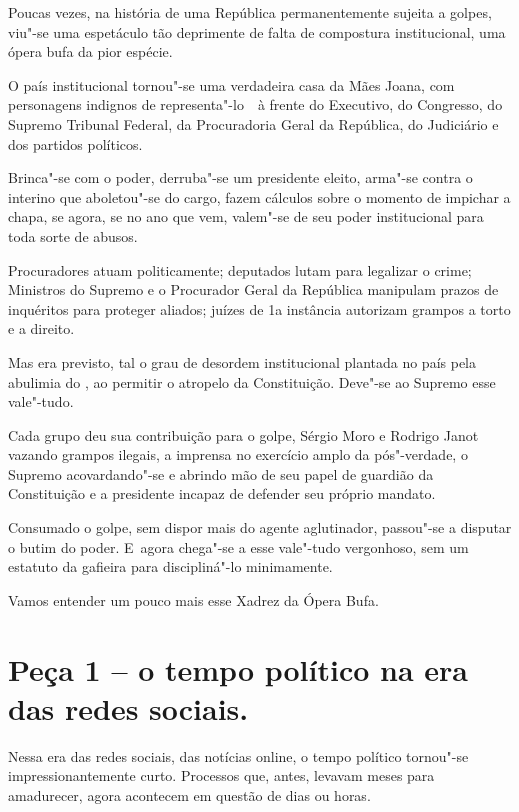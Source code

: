  

Poucas vezes, na história de uma República permanentemente sujeita a
golpes, viu"-se uma espetáculo tão deprimente de falta de compostura
institucional, uma ópera bufa da pior espécie.

O país institucional tornou"-se uma verdadeira casa da Mães Joana, com
personagens indignos de representa"-lo~~à frente do Executivo, do
Congresso, do Supremo Tribunal Federal, da Procuradoria Geral da
República, do Judiciário e dos partidos políticos.

Brinca"-se com o poder, derruba"-se um presidente eleito, arma"-se contra o
interino que aboletou"-se do cargo, fazem cálculos sobre o momento de
impichar a chapa, se agora, se no ano que vem, valem"-se de seu poder
institucional para toda sorte de abusos.

Procuradores atuam politicamente; deputados lutam para legalizar o
crime; Ministros do Supremo e o Procurador Geral da República manipulam
prazos de inquéritos para proteger aliados; juízes de 1a instância
autorizam grampos a torto e a direito.

Mas era previsto, tal o grau de desordem institucional plantada no país
pela abulimia do , ao permitir o atropelo da Constituição. Deve"-se ao
Supremo esse vale"-tudo.

Cada grupo deu sua contribuição para o golpe, Sérgio Moro e Rodrigo
Janot vazando grampos ilegais, a imprensa no exercício amplo da
pós"-verdade, o Supremo acovardando"-se e abrindo mão de seu papel de
guardião da Constituição e a presidente incapaz de defender seu próprio
mandato.

Consumado o golpe, sem dispor mais do agente aglutinador, passou"-se a
disputar o butim do poder. E~agora chega"-se a esse vale"-tudo vergonhoso,
sem um estatuto da gafieira para discipliná"-lo minimamente.

Vamos entender um pouco mais esse Xadrez da Ópera Bufa.

\section{Peça 1 -- o tempo político na era das redes sociais.}

Nessa era das redes sociais, das notícias online, o tempo político
tornou"-se impressionantemente curto. Processos que, antes, levavam meses
para amadurecer, agora acontecem em questão de dias ou horas.

